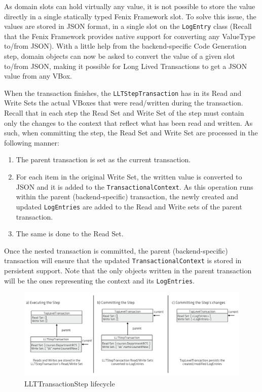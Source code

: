 \documentclass{llncs}
\begin{document}
As domain slots can hold virtually any value, it is not possible to
store the value directly in a single statically typed Fenix Framework
slot. To solve this issue, the values are stored in JSON format, in a
single slot on the \texttt{LogEntry} class (Recall that the Fenix
Framework provides native support for converting any ValueType to/from
JSON). With a little help from the backend-specific Code Generation
step, domain objects can now be asked to convert the value of a given
slot to/from JSON, making it possible for Long Lived Transactions to
get a JSON value from any VBox.

When the transaction finishes, the \texttt{LLTStepTransaction} has in
its Read and Write Sets the actual VBoxes that were read/written
during the transaction. Recall that in each step the Read Set and
Write Set of the step must contain only the changes to the context
that reflect what has been read and written. As such, when committing
the step, the Read Set and Write Set are processed in the following
manner:

\begin{enumerate}

\item The parent transaction is set as the current transaction.

\item For each item in the original Write Set, the written value is
  converted to JSON and it is added to the
  \texttt{TransactionalContext}. As this operation runs within the
  parent (backend-specific) transaction, the newly created and updated
  \texttt{LogEntries} are added to the Read and Write sets of the
  parent transaction.

\item The same is done to the Read Set.

\end{enumerate}

Once the nested transaction is committed, the parent
(backend-specific) transaction will ensure that the updated
\texttt{TransactionalContext} is stored in persistent support. Note
that the only objects written in the parent transaction will be the
ones representing the context and its \texttt{LogEntries}.

\begin{figure}
\centering
\includegraphics[width=.9\linewidth]{llt-step-lifecycle}
\caption{LLTTransactionStep lifecycle}
\label{fig:llt-lifecycle}
\end{figure}
\end{document}
